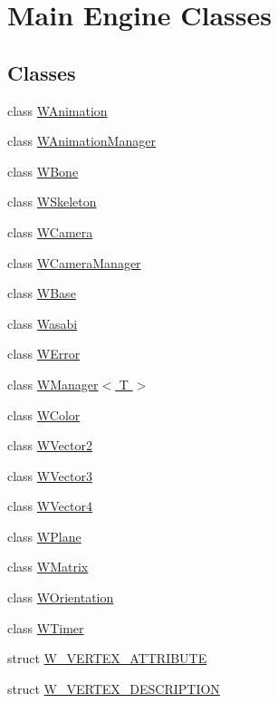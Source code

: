 \hypertarget{group__engineclass}{}\section{Main Engine Classes}
\label{group__engineclass}
\subsection*{Classes}
\begin{DoxyCompactItemize}
\item 
class \hyperlink{class_w_animation}{W\+Animation}
\item 
class \hyperlink{class_w_animation_manager}{W\+Animation\+Manager}
\item 
class \hyperlink{class_w_bone}{W\+Bone}
\item 
class \hyperlink{class_w_skeleton}{W\+Skeleton}
\item 
class \hyperlink{class_w_camera}{W\+Camera}
\item 
class \hyperlink{class_w_camera_manager}{W\+Camera\+Manager}
\item 
class \hyperlink{class_w_base}{W\+Base}
\item 
class \hyperlink{class_wasabi}{Wasabi}
\item 
class \hyperlink{class_w_error}{W\+Error}
\item 
class \hyperlink{class_w_manager}{W\+Manager$<$ T $>$}
\item 
class \hyperlink{class_w_color}{W\+Color}
\item 
class \hyperlink{class_w_vector2}{W\+Vector2}
\item 
class \hyperlink{class_w_vector3}{W\+Vector3}
\item 
class \hyperlink{class_w_vector4}{W\+Vector4}
\item 
class \hyperlink{class_w_plane}{W\+Plane}
\item 
class \hyperlink{class_w_matrix}{W\+Matrix}
\item 
class \hyperlink{class_w_orientation}{W\+Orientation}
\item 
class \hyperlink{class_w_timer}{W\+Timer}
\item 
struct \hyperlink{struct_w___v_e_r_t_e_x___a_t_t_r_i_b_u_t_e}{W\+\_\+\+V\+E\+R\+T\+E\+X\+\_\+\+A\+T\+T\+R\+I\+B\+U\+TE}
\item 
struct \hyperlink{struct_w___v_e_r_t_e_x___d_e_s_c_r_i_p_t_i_o_n}{W\+\_\+\+V\+E\+R\+T\+E\+X\+\_\+\+D\+E\+S\+C\+R\+I\+P\+T\+I\+ON}
\item 

\end{DoxyCompactItemize}

